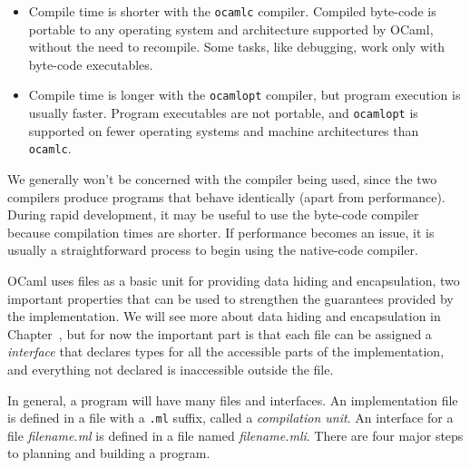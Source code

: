 \begin{itemize}

\item 

Compile time is shorter with the \hbox{\lstinline/ocamlc/}
compiler. Compiled byte-code is portable to any operating system and
architecture supported by OCaml, without the need to recompile. Some
tasks, like debugging, work only with byte-code executables.

\item

Compile time is longer with the \hbox{\lstinline/ocamlopt/} compiler,
but program execution is usually faster.  Program executables are not
portable, and \hbox{\lstinline/ocamlopt/} is supported on fewer operating
systems and machine architectures than \hbox{\lstinline/ocamlc/}.

\end{itemize}
%
We generally won't be concerned with the compiler being used, since
the two compilers produce programs that behave identically (apart from
performance).  During rapid development, it may be useful to use the
byte-code compiler because compilation times are shorter. If
performance becomes an issue, it is usually a straightforward process
to begin using the native-code compiler.


OCaml uses files as a basic unit for providing data hiding and
encapsulation, two important properties that can be used to strengthen
the guarantees provided by the implementation. We will see more about
data hiding and encapsulation in Chapter~,
but for now the important part is that each file can be assigned
a \emph{interface} that declares types for all the accessible parts of
the implementation, and everything not declared is inaccessible
outside the file.

In general, a program will have many files and interfaces. An
implementation file is defined in a file with a \hbox{\lstinline/.ml/}
suffix, called a \emph{compilation unit}. An interface for a
file \emph{filename.ml} is defined in a file
named \emph{filename.mli}. There are four major steps to planning and
building a program.

